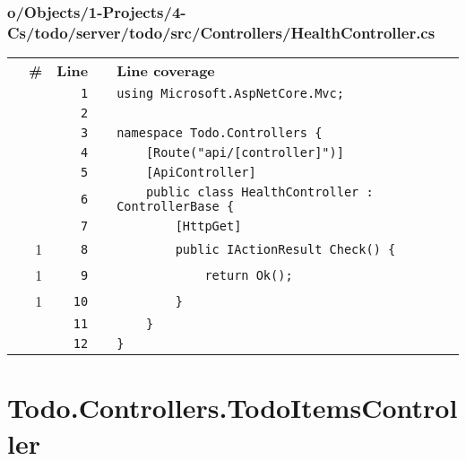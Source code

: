 \documentclass[a4paper,landscape,10pt]{article}
\begin{document}
\subsubsection{o/Objects/1-Projects/4-Cs/todo/server/todo/src/Controllers/HealthController.cs}
\begin{longtable}[l]{lrrll}
\textbf{} & \textbf{\#} & \textbf{Line} & \textbf{} & \textbf{Line coverage}\\
\cellcolor{gray} &  & \verb~1~ & & \verb~using Microsoft.AspNetCore.Mvc;~\\
\cellcolor{gray} &  & \verb~2~ & & \verb~~\\
\cellcolor{gray} &  & \verb~3~ & & \verb~namespace Todo.Controllers {~\\
\cellcolor{gray} &  & \verb~4~ & & \verb~    [Route("api/[controller]")]~\\
\cellcolor{gray} &  & \verb~5~ & & \verb~    [ApiController]~\\
\cellcolor{gray} &  & \verb~6~ & & \verb~    public class HealthController : ControllerBase {~\\
\cellcolor{gray} &  & \verb~7~ & & \verb~        [HttpGet]~\\
\cellcolor{green} & 1 & \verb~8~ & & \verb~        public IActionResult Check() {~\\
\cellcolor{green} & 1 & \verb~9~ & & \verb~            return Ok();~\\
\cellcolor{green} & 1 & \verb~10~ & & \verb~        }~\\
\cellcolor{gray} &  & \verb~11~ & & \verb~    }~\\
\cellcolor{gray} &  & \verb~12~ & & \verb~}~\\
\end{longtable}
\newpage
\section{Todo.Controllers.TodoItemsController}
\end{document}
